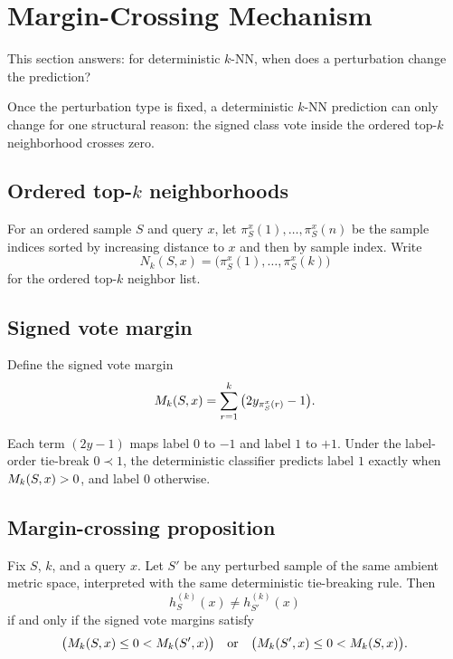 \section{Margin-Crossing Mechanism}
\label{sec:margin-mechanism}

This section answers: for deterministic $k$-NN, when does a perturbation
change the prediction?

Once the perturbation type is fixed, a deterministic $k$-NN prediction can only
change for one structural reason: the signed class vote inside the ordered
top-$k$ neighborhood crosses zero.

\subsection{Ordered top-$k$ neighborhoods}

For an ordered sample $S$ and query $x$, let
$\pi_S^x(1),\ldots,\pi_S^x(n)$ be the sample indices sorted by increasing
distance to $x$ and then by sample index.  Write
\[
N_k(S,x) = \big(\pi_S^x(1),\ldots,\pi_S^x(k)\big)
\]
for the ordered top-$k$ neighbor list.

\subsection{Signed vote margin}

Define the signed vote margin
\[
M_k(S,x) = \sum_{r=1}^{k} \big(2y_{\pi_S^x(r)}-1\big).
\]

Each term $(2y-1)$ maps label $0$ to $-1$ and label $1$ to $+1$.  Under the
label-order tie-break $0 \prec 1$, the deterministic classifier predicts label
$1$ exactly when $M_k(S,x) > 0$, and label $0$ otherwise.

\subsection{Margin-crossing proposition}

\begin{proposition}
\label{prop:5.1}
Fix $S$, $k$, and a query $x$.  Let $S'$ be any perturbed sample of the same
ambient metric space, interpreted with the same deterministic tie-breaking
rule.  Then
\[
h_S^{(k)}(x) \neq h_{S'}^{(k)}(x)
\]
if and only if the signed vote margins satisfy
\[
\big(M_k(S,x) \le 0 < M_k(S',x)\big)
\quad\text{or}\quad
\big(M_k(S',x) \le 0 < M_k(S,x)\big).
\]
\end{proposition}

